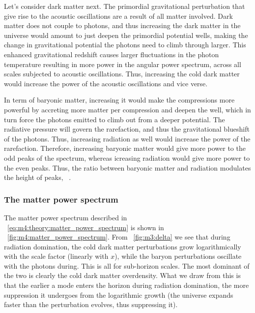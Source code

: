         Let's consider dark matter next. The primordial gravitational perturbation that give rise to the acoustic oscillations are a result of all matter involved. Dark matter does not couple to photons, and thus increasing the dark matter in the universe would amount to just deepen the primordial potential wells, making the change in gravitational potential the photons need to climb through larger. This enhanced gravitational redshift causes larger fluctuations in the photon temperature resulting in more power in the angular power spectrum, across all scales subjected to acoustic oscillations. Thus, increasing the cold dark matter would increase the power of the acoustic oscillations and vice verse. 

        In term of baryonic matter, increasing it would make the compressions more powerful by accreting more matter per compression and deepen the well, which in turn force the photons emitted to climb out from a deeper potential. The radiative pressure will govern the rarefaction, and thus the gravitational blueshift of the photons. Thus, increasing radiation as well would increase the power of the rarefaction. Therefore, increasing baryonic matter would give more power to the odd peaks of the spectrum, whereas icreasing radiation would give more power to the even peaks. Thus, the ratio between baryonic matter and radiation modulates the height of peaks, ~\cite{Hu_1996}.

    \subsubsection{The matter power spectrum}
        The matter power spectrum described in ~\cref{eq:m4:theory:matter_power_spectrum} is shown in ~\cref{fig:m4:matter_power_spectrum}. From ~\cref{fig:m3:delta} we see that during radiation domination, the cold dark matter perturbations grow logarithmically with the scale factor (linearly with $x$), while the baryon perturbations oscillate with the photons during. This is all for sub-horizon scales. The most dominant of the two is clearly the cold dark matter overdensity. What we draw from this is that the earlier a mode enters the horizon during radiation domination, the more suppression it undergoes from the logarithmic growth (the universe expands faster than the perturbation evolves, thus suppressing it). 

